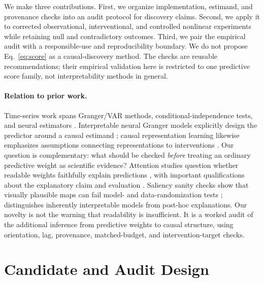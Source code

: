 We make three contributions. First, we organize implementation, estimand, and
provenance checks into an audit protocol for discovery claims. Second, we
apply it to corrected observational, interventional, and controlled nonlinear
experiments while retaining null and contradictory outcomes. Third, we pair
the empirical audit with a responsible-use and reproducibility boundary. We
do not propose Eq.~\ref{eq:score} as a causal-discovery method. The checks
are reusable recommendations; their empirical validation here is restricted
to one predictive score family, not interpretability methods in general.

\paragraph{Relation to prior work.}
Time-series work spans Granger/VAR methods, conditional-independence tests,
and neural estimators
\citep{runge2019pcmci,runge2020discovering,tank2021neural,nauta2019causal,pamfil2020dynotears}.
Interpretable neural Granger models explicitly design the predictor around a
causal estimand \citep{marcinkevics2021interpretable}; causal representation
learning likewise emphasizes assumptions connecting representations to
interventions \citep{scholkopf2021toward}. Our question is complementary:
what should be checked \emph{before} treating an ordinary predictive weight
as scientific evidence? Attention studies question whether readable weights
faithfully explain predictions \citep{jain2019attention}, with important
qualifications about the explanatory claim and evaluation
\citep{wiegreffe2019attention}. Saliency sanity checks show that visually
plausible maps can fail model- and data-randomization tests
\citep{adebayo2018sanity}; \citet{rudin2019stop} distinguishes inherently
interpretable models from post-hoc explanations. Our novelty is not the
warning that readability is insufficient. It is a worked audit of the
additional inference from predictive weights to causal structure, using
orientation, lag, provenance, matched-budget, and intervention-target checks.

\section{Candidate and Audit Design}

